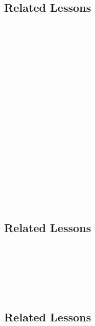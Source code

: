 \subsection{Related Lessons}
\fouraOne{}\\
\fouraTwo{}\\
\fouraThree{}\\
\fouraFour{}\\
\fouraNine{}\\ 
\fouraTen{}\\
\fourdFive{}\\
\fourhTwo{}\\
\fourhThree{}\\
\fourhFour{}\\
\fourhFive{}\\
\fouriOne{}\\
\fouriFive{}\\
\fourkSeven{}\\
\fourFKThirtyThree{}\\
\fourFKFourtyOne{}\\
\fourFKFourtySeven{}\\
\fourFKFourtyEight{}\\
%
\subsection{Related Lessons} 
\fouraNine{}\\ 
\fourhOne{}\\
\fouriOne{}\\
\fourFKFourtySeven{}\\
\fourFKFourtyEight{}\\
%
\subsection{Related Lessons}
\fouraTwelve{}\\
\fouraThirteen{}\\
\fourhOne{}\\
\fouriOne{}\\
\fourFKFourtySeven{}\\
\fourFKFourtyEight{}\\

